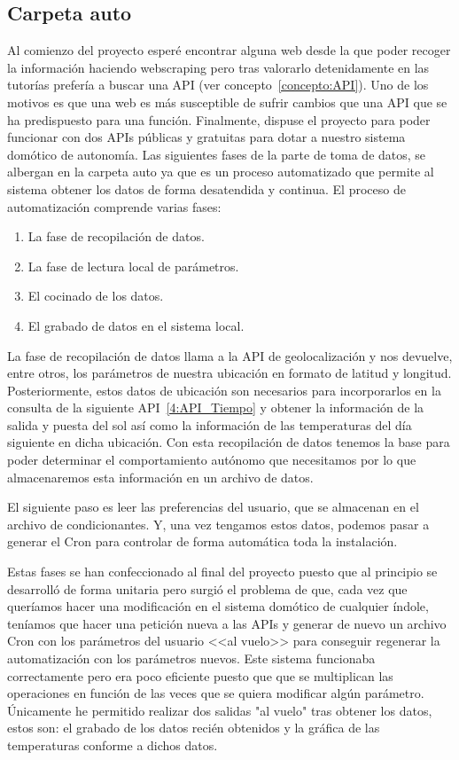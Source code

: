 \subsection{Carpeta auto}
Al comienzo del proyecto esperé encontrar alguna web desde la que poder recoger la información haciendo webscraping pero tras valorarlo detenidamente en las tutorías prefería a buscar una API (ver concepto~\ref{concepto:API}). Uno de los motivos es que una web es más susceptible de sufrir cambios que una API que se ha predispuesto para una función.
Finalmente, dispuse el proyecto para poder funcionar con dos APIs públicas y gratuitas para dotar a nuestro sistema domótico de autonomía.
Las siguientes fases de la parte de toma de datos, se albergan en la carpeta auto ya que es un proceso automatizado que permite al sistema obtener los datos de forma desatendida y continua.
El proceso de automatización comprende varias fases:
\begin{enumerate}
    \item La fase de recopilación de datos.
    \item La fase de lectura local de parámetros.
    \item El cocinado de los datos.
    \item El grabado de datos en el sistema local.
\end{enumerate}
La fase de recopilación de datos llama a la API de geolocalización y nos devuelve, entre otros, los parámetros de nuestra ubicación en formato de latitud y longitud. Posteriormente, estos datos de ubicación son necesarios para incorporarlos en la consulta de la siguiente API~\ref{4:API_Tiempo} y obtener la información de la salida y puesta del sol así como la información de las temperaturas del día siguiente en dicha ubicación. Con esta recopilación de datos tenemos la base para poder determinar el comportamiento autónomo que necesitamos por lo que almacenaremos esta información en un archivo de datos.

El siguiente paso es leer las preferencias del usuario, que se almacenan en el archivo de condicionantes. Y, una vez tengamos estos datos, podemos pasar a generar el Cron para controlar de forma automática toda la instalación.

Estas fases se han confeccionado al final del proyecto puesto que al principio se desarrolló de forma unitaria pero surgió el problema de que, cada vez que queríamos hacer una modificación en el sistema domótico de cualquier índole, teníamos que hacer una petición nueva a las APIs y generar de nuevo un archivo Cron con los parámetros del usuario <<al vuelo>> para conseguir regenerar la automatización con los parámetros nuevos. Este sistema funcionaba correctamente pero era poco eficiente puesto que que se multiplican las operaciones en función de las veces que se quiera modificar algún parámetro.
Únicamente he permitido realizar dos salidas "al vuelo" tras obtener los datos, estos son: el grabado de los datos recién obtenidos y la gráfica de las temperaturas conforme a dichos datos.

